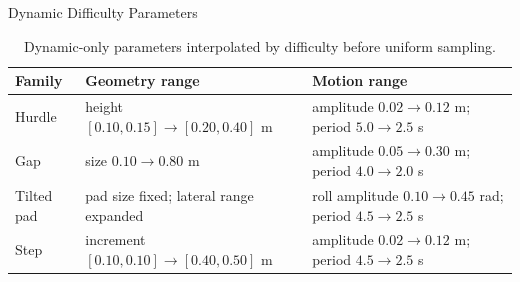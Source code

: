 \documentclass[aspectratio=169,xcolor=dvipsnames]{beamer}
\begin{document}

\begin{frame}{Dynamic Difficulty Parameters}
    \scriptsize
    \begin{table}
        \centering
        \caption{Dynamic-only parameters interpolated by difficulty before uniform sampling.}
        \begin{tabular}{lll}
            \toprule
            Family & Geometry range & Motion range \\
            \midrule
            Hurdle & height $[0.10,0.15]\rightarrow[0.20,0.40]$ m & amplitude $0.02\rightarrow0.12$ m; period $5.0\rightarrow2.5$ s \\
            Gap & size $0.10\rightarrow0.80$ m & amplitude $0.05\rightarrow0.30$ m; period $4.0\rightarrow2.0$ s \\
            Tilted pad & pad size fixed; lateral range expanded & roll amplitude $0.10\rightarrow0.45$ rad; period $4.5\rightarrow2.5$ s \\
            Step & increment $[0.10,0.10]\rightarrow[0.40,0.50]$ m & amplitude $0.02\rightarrow0.12$ m; period $4.5\rightarrow2.5$ s \\
            \bottomrule
        \end{tabular}
    \end{table}
\end{frame}
\end{document}
